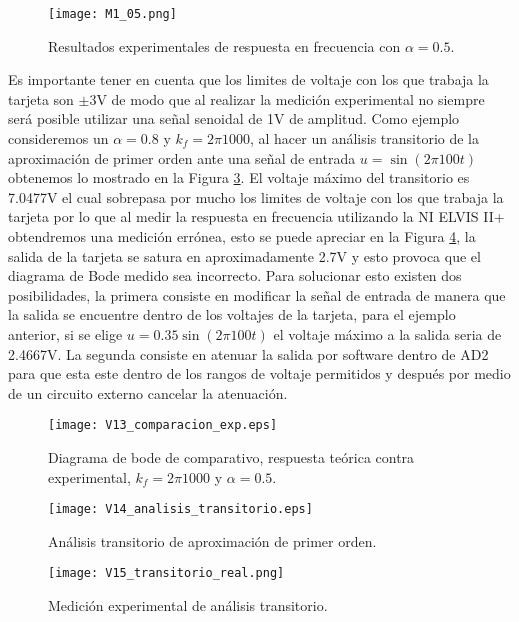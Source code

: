 	
	\begin{figure}[!ht] 
		\caption{Resultados experimentales de respuesta en frecuencia con $\alpha = 0.5$.}
		\label{fig:M1_05}
		\centering
		\texttt{[image: M1\_05.png]}
	\end{figure}
	
	Es importante tener en cuenta que los limites de voltaje con los que trabaja la tarjeta son $\pm 3$V de modo que al realizar la medición experimental no siempre será posible utilizar una señal senoidal de 1V de amplitud. Como ejemplo consideremos un $\alpha = 0.8$ y $k_{f} = 2 \pi 1000$, al hacer un análisis transitorio de la aproximación de primer orden ante una señal de entrada $u = \sin(2 \pi 100 t)$ obtenemos lo mostrado en la Figura \ref{fig:V14_analisis_transitorio}. El voltaje máximo del transitorio es 7.0477V el cual sobrepasa por mucho los limites de voltaje con los que trabaja la tarjeta por lo que al medir la respuesta en frecuencia utilizando la NI ELVIS II+ obtendremos una medición errónea, esto se puede apreciar en la Figura \ref{fig:V15_transitorio_real}, la salida de la tarjeta se satura en aproximadamente 2.7V y esto provoca que el diagrama de Bode medido sea incorrecto. Para solucionar esto existen dos posibilidades, la primera consiste en modificar la señal de entrada de manera que la salida se encuentre dentro de los voltajes de la tarjeta, para el ejemplo anterior, si se elige $u = 0.35\sin(2 \pi 100 t)$ el voltaje máximo a la salida seria de 2.4667V. La segunda consiste en atenuar la salida por software dentro de AD2 para que esta este dentro de los rangos de voltaje permitidos y después por medio de un circuito externo cancelar la atenuación.
	
	\begin{figure}[hbtp]
		\caption{Diagrama de bode de comparativo, respuesta teórica contra experimental,  $k_{f} = 2\pi 1000$ y  $\alpha = 0.5$.} 
		\label{fig:V13_comparacion_exp}
		\centering
		\texttt{[image: V13\_comparacion\_exp.eps]}
	\end{figure}
	
	\begin{figure}[!ht]
		\caption{Análisis transitorio de aproximación de primer orden.} 
		\label{fig:V14_analisis_transitorio}
		\centering
		\texttt{[image: V14\_analisis\_transitorio.eps]}
	\end{figure}
	
	\begin{figure}[!ht]
		\caption{Medición experimental de análisis transitorio.} 
		\label{fig:V15_transitorio_real}
		\centering
		\texttt{[image: V15\_transitorio\_real.png]}
	\end{figure}

